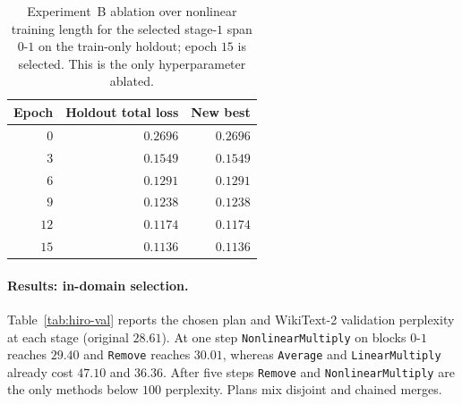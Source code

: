 \documentclass[10pt,a4paper]{article}
\newcommand{\removeop}{\texttt{Remove}}
\newcommand{\averageop}{\texttt{Average}}
\newcommand{\linop}{\texttt{LinearMultiply}}
\newcommand{\nlop}{\texttt{NonlinearMultiply}}
\begin{document}
\begin{table}[t]
\centering
\small
\begin{tabular}{rrr}
\toprule
Epoch & Holdout total loss & New best \\
\midrule
$0$  & $0.2696$ & $0.2696$ \\
$3$  & $0.1549$ & $0.1549$ \\
$6$  & $0.1291$ & $0.1291$ \\
$9$  & $0.1238$ & $0.1238$ \\
$12$ & $0.1174$ & $0.1174$ \\
$15$ & $0.1136$ & $0.1136$ \\
\bottomrule
\end{tabular}
\caption{Experiment~B ablation over nonlinear training length for the selected
stage-$1$ span $0\text{-}1$ on the train-only holdout; epoch $15$ is selected.
This is the only hyperparameter ablated.}
\label{tab:ablation-b}
\end{table}

\paragraph{Results: in-domain selection.} Table~\ref{tab:hiro-val} reports the
chosen plan and WikiText-2 validation perplexity at each stage (original
$28.61$). At one step \nlop{} on blocks $0\text{-}1$ reaches $29.40$ and
\removeop{} reaches $30.01$, whereas \averageop{} and \linop{} already cost
$47.10$ and $36.36$. After five steps \removeop{} and \nlop{} are the only
methods below $100$ perplexity. Plans mix disjoint and chained merges.
\end{document}
